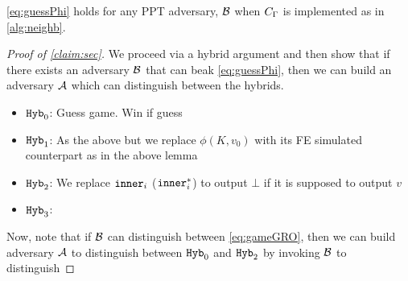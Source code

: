 \begin{claim} 
	\label{claim:sec}
	\cref{eq:guessPhi} holds for any PPT adversary, $\mathcal{B}$ when $C_\Gamma$ is implemented as in \cref{alg:neighb}.
\end{claim}
\begin{proof}[Proof of \cref{claim:sec}]
We proceed via a hybrid argument and then show that if there exists an adversary $\mathcal{B}$ that can beak \cref{eq:guessPhi},
then we can build an adversary $\mathcal{A}$ which can distinguish between the hybrids.



% 
%

\begin{itemize}
	\item $\texttt{Hyb}_0$: Guess game. Win if guess
	\item $\texttt{Hyb}_1$: As the above but we replace $\phi(K, v_0)$ with its FE simulated counterpart
	as in the above lemma
	\item $\texttt{Hyb}_2$: We replace $\texttt{inner}_i$ ($\texttt{inner}_i^*$) to output $\bot$ if it is supposed to output $v$
	\item $\texttt{Hyb}_3$: 

\end{itemize}

Now, note that if $\mathcal{B}$ can distinguish between \cref{eq:gameGRO}, then we can build adversary $\mathcal{A}$ to distinguish between $\texttt{Hyb}_0$ and $\texttt{Hyb}_2$ by invoking $\mathcal{B}$ to distinguish
\end{proof}

